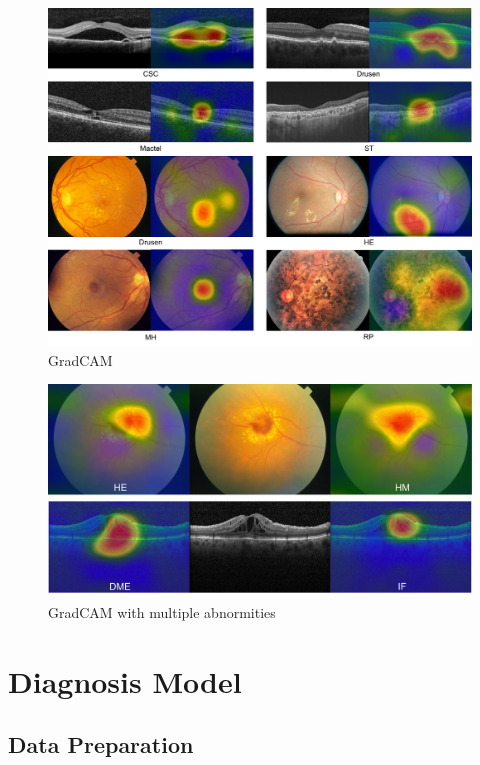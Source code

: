 \documentclass{article}
\begin{document}
	\begin{figure}[htbp]
		\centering
		\includegraphics[width=\linewidth]{Figs/abnormity_gradCAM.pdf}
		\caption{GradCAM}
		\vspace{0.3cm}
		\label{fig:gradCAM}
	\end{figure}
	\begin{figure}[htbp]
		\centering
		\includegraphics[width=0.8\linewidth]{Figs/abnormity_gradCAM_multiple_abnormities.pdf}
		\caption{GradCAM with multiple abnormities}
		\vspace{0.3cm}
		\label{fig:gradCAM_multi_abnormity}
	\end{figure}
	
	\section{Diagnosis Model}
	
	\subsection{Data Preparation}
	
\end{document}
